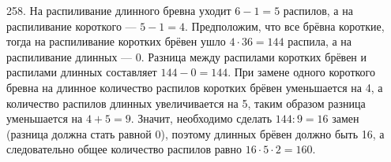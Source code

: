 258. На распиливание длинного бревна уходит $6-1=5$ распилов, а на распиливание короткого --- $5-1=4.$ Предположим, что все брёвна короткие, тогда на распиливание коротких брёвен ушло $4\cdot36=144$ распила, а на распиливание длинных --- 0. Разница между распилами коротких брёвен и распилами длинных составляет $144-0=144.$ При замене одного короткого бревна на длинное количество распилов коротких брёвен уменьшается на 4, а количество распилов длинных увеличивается на 5, таким образом разница уменьшается на $4+5=9.$ Значит, необходимо сделать $144:9=16$ замен (разница должна стать равной 0), поэтому длинных брёвен должно быть 16, а следовательно общее количество распилов равно $16\cdot5\cdot2=160.$\\
